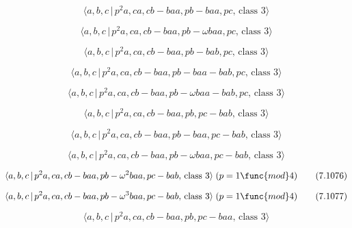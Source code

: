 \documentclass[10pt]{article}
\begin{document}
\begin{equation}
\langle a,b,c\,|\,p^2a,ca,cb-baa,pb-baa,pc,\,\text{class }3\rangle 
\tag{7.1068}
\end{equation}

\begin{equation}
\langle a,b,c\,|\,p^{2}a,ca,cb-baa,pb-\omega baa,pc,\,\text{class }3\rangle 
\tag{7.1069}
\end{equation}

\begin{equation}
\langle a,b,c\,|\,p^2a,ca,cb-baa,pb-bab,pc,\,\text{class }3\rangle 
\tag{7.1070}
\end{equation}

\begin{equation}
\langle a,b,c\,|\,p^2a,ca,cb-baa,pb-baa-bab,pc,\,\text{class }3\rangle 
\tag{7.1071}
\end{equation}

\begin{equation}
\langle a,b,c\,|\,p^{2}a,ca,cb-baa,pb-\omega baa-bab,pc,\,\text{class }%
3\rangle  \tag{7.1072}
\end{equation}

\begin{equation}
\langle a,b,c\,|\,p^2a,ca,cb-baa,pb,pc-bab,\,\text{class }3\rangle 
\tag{7.1073}
\end{equation}

\begin{equation}
\langle a,b,c\,|\,p^2a,ca,cb-baa,pb-baa,pc-bab,\,\text{class }3\rangle 
\tag{7.1074}
\end{equation}

\begin{equation}
\langle a,b,c\,|\,p^{2}a,ca,cb-baa,pb-\omega baa,pc-bab,\,\text{class }%
3\rangle  \tag{7.1075}
\end{equation}

\begin{equation}
\langle a,b,c\,|\,p^{2}a,ca,cb-baa,pb-\omega ^{2}baa,pc-bab,\,\text{class }%
3\rangle \;(p=1\func{mod}4)  \tag{7.1076}
\end{equation}

\begin{equation}
\langle a,b,c\,|\,p^{2}a,ca,cb-baa,pb-\omega ^{3}baa,pc-bab,\,\text{class }%
3\rangle \;(p=1\func{mod}4)  \tag{7.1077}
\end{equation}

\begin{equation}
\langle a,b,c\,|\,p^2a,ca,cb-baa,pb,pc-baa,\,\text{class }3\rangle 
\tag{7.1078}
\end{equation}
\end{document}
